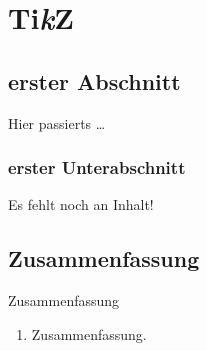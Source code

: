 \chapter{Ti\emph{k}Z}


\website

\section{erster Abschnitt}

\begin{Frame}{Hier passierts}
  \ldots
\end{Frame}

\subsection{erster Unterabschnitt}

\begin{Frame}
  Es fehlt noch an Inhalt!
\end{Frame}

\section*{Zusammenfassung}

\begin{frame}{Zusammenfassung}
  \begin{enumerate}
    \item Zusammenfassung.
  \end{enumerate}
\end{frame}